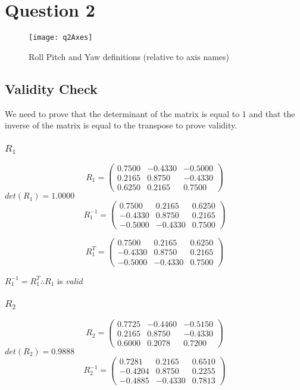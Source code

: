 \newpage
\section{Question 2}
	
	\begin{figure}
		\texttt{[image: q2Axes]}
		\caption[\textit{RPYAxes}]{Roll Pitch and Yaw definitions (relative to axis names)}
	\end{figure}
	\subsection{Validity Check}
	We need to prove that the determinant of the matrix is equal to 1 and that the inverse of the matrix is equal to the transpose to prove validity.
		\subsubsection{$R_{1}$}
			$$
			R_{1} =
			\begin{pmatrix}
				0.7500 & -0.4330 & -0.5000\\
				0.2165 & 0.8750 & -0.4330\\
				0.6250  & 0.2165  & 0.7500
			\end{pmatrix}
			$$
			\hspace{35mm}$det(R_{1}) = 1.0000$
			\\
			$$
			R_{1}^{-1} =
			\begin{pmatrix}
				0.7500 & 0.2165 & 0.6250\\
				-0.4330 & 0.8750 & 0.2165\\
				-0.5000  & -0.4330  & 0.7500
			\end{pmatrix}
			$$
			
			$$
			R_{1}^{T} =
			\begin{pmatrix}
				0.7500 & 0.2165 & 0.6250\\
				-0.4330 & 0.8750 & 0.2165\\
				-0.5000  & -0.4330  & 0.7500
			\end{pmatrix}
			$$
			
			\hspace{30mm}$R_{1}^{-1} = R_{1}^{T}\therefore R_{1}$ is \emph{valid}
			
			
		\subsubsection{$R_{2}$}
			$$
			R_{2} =
			\begin{pmatrix}
				0.7725 & -0.4460 & -0.5150\\
				0.2165 & 0.8750 & -0.4330\\
				0.6000  & 0.2078  & 0.7200
			\end{pmatrix}
			$$
			\hspace{35mm}$det(R_{2}) = 0.9888$
			\\
			$$
			R_{2}^{-1} =
			\begin{pmatrix}
				0.7281 & 0.2165 & 0.6510\\
				-0.4204 & 0.8750 & 0.2255\\
				-0.4885  & -0.4330  & 0.7813
			\end{pmatrix}
			$$
					
